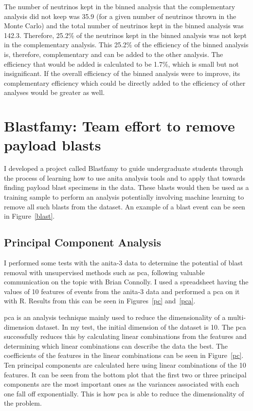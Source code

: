 The number of neutrinos kept in the binned analysis that the complementary analysis did not keep was 35.9 (for a given number of neutrinos thrown in the Monte Carlo) and the total number of neutrinos kept in the binned analysis was 142.3. Therefore, 25.2\% of the neutrinos kept in the binned analysis was not kept in the complementary analysis. This 25.2\% of the efficiency of the binned analysis is, therefore, complementary and can be added to the other analysis. The efficiency that would be added is calculated to be 1.7\%, which is small but not insignificant. If the overall efficiency of the binned analysis were to improve, its complementary efficiency which could be directly added to the efficiency of other analyses would be greater as well. 


\section{Blastfamy: Team effort to remove payload blasts}
\label{blastfamy}

I developed a project called Blastfamy to guide undergraduate students through the process of learning how to use \gls{anita} analysis tools and to apply that towards finding payload blast specimens in the data. These blasts would then be used as a training sample to perform an analysis potentially involving machine learning to remove all such blasts from the dataset. An example of a blast event can be seen in Figure~\ref{blast}. 

\subsection{Principal Component Analysis}

I performed some tests with the \gls{anita}-3 data to determine the potential of blast removal with unsupervised methods such as \gls{pca}, following valuable communication on the topic with Brian Connolly. I used a spreadsheet having the values of 10 features of events from the \gls{anita}-3 data and performed a \gls{pca} on it with R. Results from this can be seen in Figures~\ref{pc} and~\ref{pca}. 

\gls{pca} is an analysis technique mainly used to reduce the dimensionality of a multi-dimension dataset. In my test, the initial dimension of the dataset is 10. The \gls{pca} successfully reduces this by calculating linear combinations from the features and determining which linear combinations can describe the data the best. The coefficients of the features in the linear combinations can be seen in Figure~\ref{pc}. Ten principal components are calculated here using linear combinations of the 10 features. It can be seen from the bottom plot that the first two or three principal components are the most important ones as the variances associated with each one fall off exponentially. This is how \gls{pca} is able to reduce the dimensionality of the problem. 

